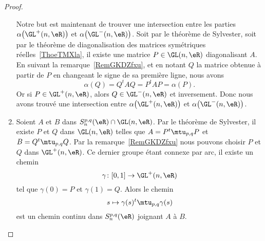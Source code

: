 \begin{proof}
\begin{enumerate}
            Notre but est maintenant de trouver une intersection entre les parties \( \alpha\big( \GL^+(n,\eR) \big)\) et \( \alpha\big( \GL^-(n,\eR) \big)\). Soit par le théorème de Sylvester, soit par le théorème de diagonalisation des matrices symétriques réelles~\ref{ThoeTMXla}, il existe une matrice \( P\in \GL(n,\eR)\) diagonalisant \( A\). En suivant la remarque~\ref{RemGKDZfxu}, et en notant \( Q\) la matrice obtenue à partir de \( P\) en changeant le signe de sa première ligne, nous avons
            \begin{equation}
                \alpha(Q)=Q^tAQ=P^tAP=\alpha(P).
            \end{equation}
            Or si \( P\in \GL^+(n,\eR)\), alors \( Q\in \GL^-(n,\eR)\) et inversement. Donc nous avons trouvé une intersection entre \( \alpha\big( \GL^+(n,\eR) \big)\) et \( \alpha\big( \GL^-(n,\eR) \big)\).

        \item

            Soient \( A\) et \( B\) dans \( S_n^{p,q}(\eR)\cap\GL(n,\eR)\). Par le théorème de Sylvester, il existe \( P\) et \( Q\) dans \( \GL(n,\eR)\) telles que \( A=P^t\mtu_{p,q}P\) et \( B=Q^t\mtu_{p,q}Q\). Par la remarque~\ref{RemGKDZfxu} nous pouvons choisir \( P\) et \( Q\) dans \( \GL^+(n,\eR)\). Ce dernier groupe étant connexe par arc, il existe un chemin
            \begin{equation}
                    \gamma\colon \mathopen[ 0 , 1 \mathclose]\to \GL^+(n,\eR)
            \end{equation}
            tel que \( \gamma(0)=P\) et \( \gamma(1)=Q\). Alors le chemin
            \begin{equation}
                s\mapsto \gamma(s)^t\mtu_{p,q}\gamma(s)
            \end{equation}
            est un chemin continu dans \( S_n^{p,q}(\eR)\) joignant \( A\) à \( B\).
    \end{enumerate}
\end{proof}

